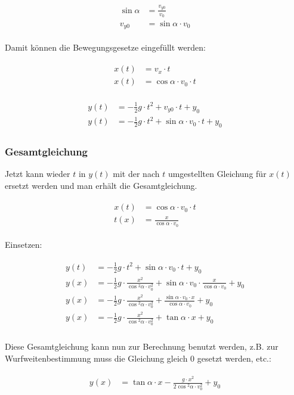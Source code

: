 \begin{align}
\begin{split}
	\sin{\alpha} &= \frac{v_{y0}}{v_0} \\
	v_{y0} &= \sin{\alpha} \cdot v_0
\end{split}
\end{align}

\noindent Damit können die Bewegungsgesetze eingefüllt werden:

\begin{align}
\begin{split}
	x(t) &= v_x \cdot t \\
	x(t) &= \cos{\alpha} \cdot v_0 \cdot t
\end{split}
\end{align}

\begin{align}
\begin{split}
	y(t) &= -\frac{1}{2}g \cdot t^2 + v_{y0} \cdot t + y_0 \\
	y(t) &= -\frac{1}{2}g \cdot t^2 + \sin{\alpha} \cdot v_0 \cdot t + y_0
\end{split}
\end{align}


\subsubsection{Gesamtgleichung}


Jetzt kann wieder $t$ in $y(t)$ mit der nach $t$ umgestellten Gleichung für $x(t)$ ersetzt werden und man erhält die Gesamtgleichung.

\begin{align}
\begin{split}
	x(t) &= \cos{\alpha} \cdot v_0 \cdot t \\
	t(x) &= \frac{x}{\cos{\alpha} \cdot v_0}
\end{split}
\end{align}

\noindent Einsetzen:

\begin{align}
\begin{split}
	y(t) &= -\frac{1}{2}g \cdot t^2 + \sin{\alpha} \cdot v_0 \cdot t + y_0 \\
	y(x) &= -\frac{1}{2}g \cdot \frac{x^2}{\cos{^2\alpha} \cdot v_0^2} + \sin{\alpha} \cdot v_0 \cdot \frac{x}{\cos{\alpha} \cdot v_0} + y_0 \\
	y(x) &= -\frac{1}{2}g \cdot \frac{x^2}{\cos{^2\alpha} \cdot v_0^2} + \frac{\sin{\alpha} \cdot v_0 \cdot x}{\cos{\alpha} \cdot v_0} + y_0 \\
	y(x) &= -\frac{1}{2}g \cdot \frac{x^2}{\cos{^2\alpha} \cdot v_0^2} + \tan{\alpha} \cdot x + y_0 \\
\end{split}
\end{align}

\noindent Diese Gesamtgleichung kann nun zur Berechnung benutzt werden, z.B. zur Wurfweitenbestimmung muss die Gleichung gleich $0$ gesetzt werden, etc.:

\begin{align}
\begin{split}
	y(x) &= \tan{\alpha} \cdot x - \frac{g \cdot x^2}{2\cos{^2\alpha} \cdot v_0^2} + y_0
\end{split}
\end{align}